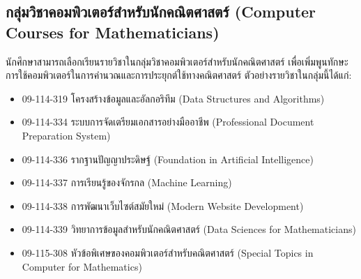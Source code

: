 \subsection*{กลุ่มวิชาคอมพิวเตอร์สำหรับนักคณิตศาสตร์ (Computer Courses for Mathematicians)}

นักศึกษาสามารถเลือกเรียนรายวิชาในกลุ่มวิชาคอมพิวเตอร์สำหรับนักคณิตศาสตร์ เพื่อเพิ่มพูนทักษะการใช้คอมพิวเตอร์ในการคำนวณและการประยุกต์ใช้ทางคณิตศาสตร์ ตัวอย่างรายวิชาในกลุ่มนี้ได้แก่:
\begin{itemize}
    \item 09-114-319 โครงสร้างข้อมูลและอัลกอริทึม (Data Structures and Algorithms)
    \item 09-114-334 ระบบการจัดเตรียมเอกสารอย่างมืออาชีพ (Professional Document Preparation System)
    \item 09-114-336 รากฐานปัญญาประดิษฐ์ (Foundation in Artificial Intelligence)
    \item 09-114-337 การเรียนรู้ของจักรกล (Machine Learning)
    \item 09-114-338 การพัฒนาเว็บไซต์สมัยใหม่ (Modern Website Development)
    \item 09-114-339 วิทยาการข้อมูลสำหรับนักคณิตศาสตร์ (Data Sciences for Mathematicians)
    \item 09-115-308 หัวข้อพิเศษของคอมพิวเตอร์สำหรับคณิตศาสตร์ (Special Topics in Computer for Mathematics)
\end{itemize}

